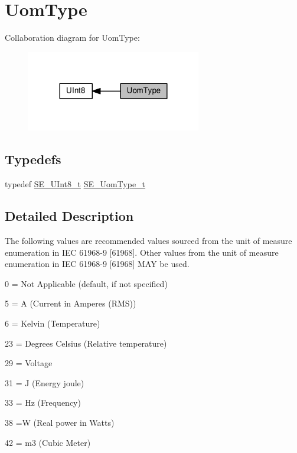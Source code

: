 \hypertarget{group__UomType}{}\section{Uom\+Type}
\label{group__UomType}
Collaboration diagram for Uom\+Type\+:\nopagebreak
\begin{figure}[H]
\begin{center}
\leavevmode
\includegraphics[width=216pt]{group__UomType}
\end{center}
\end{figure}
\subsection*{Typedefs}
\begin{DoxyCompactItemize}
\item 
typedef \hyperlink{group__UInt8_gaf7c365a1acfe204e3a67c16ed44572f5}{S\+E\+\_\+\+U\+Int8\+\_\+t} \hyperlink{group__UomType_ga35de8fcdea40d7edbdd341581cf651f1}{S\+E\+\_\+\+Uom\+Type\+\_\+t}
\end{DoxyCompactItemize}


\subsection{Detailed Description}
The following values are recommended values sourced from the unit of measure enumeration in I\+EC 61968-\/9 \mbox{[}61968\mbox{]}. Other values from the unit of measure enumeration in I\+EC 61968-\/9 \mbox{[}61968\mbox{]} M\+AY be used.

0 = Not Applicable (default, if not specified)

5 = A (Current in Amperes (R\+MS))

6 = Kelvin (Temperature)

23 = Degrees Celsius (Relative temperature)

29 = Voltage

31 = J (Energy joule)

33 = Hz (Frequency)

38 =W (Real power in Watts)

42 = m3 (Cubic Meter)

